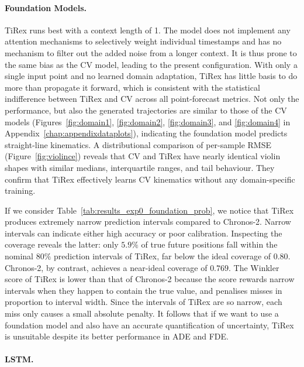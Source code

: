 \paragraph{Foundation Models.}
TiRex runs best with a context length of 1. The model does not implement any attention mechanisms to selectively weight individual timestamps and has no mechanism to filter out the added noise from a longer context. It is thus prone to the same bias as the \ac{CV} model, leading to the present configuration.
With only a single input point and no learned domain adaptation, TiRex has little basis to do more than propagate it forward, which is consistent with the statistical indifference between TiRex and \ac{CV} across all point-forecast metrics.
Not only the performance, but also the generated trajectories are similar to those of the \ac{CV} models (Figures~\ref{fig:domain1}, \ref{fig:domain2}, \ref{fig:domain3}, and \ref{fig:domain4} in Appendix~\ref{chap:appendixdataplots}), indicating the foundation model predicts straight-line kinematics.
A distributional comparison of per-sample \ac{RMSE} (Figure~\ref{fig:violince}) reveals that \ac{CV} and TiRex have nearly identical violin shapes with similar medians, interquartile ranges, and tail behaviour. They confirm that TiRex effectively learns \ac{CV} kinematics without any domain-specific training.

If we consider Table~\ref{tab:results_exp0_foundation_prob}, we notice that TiRex produces extremely narrow prediction intervals compared to Chronos-2. Narrow intervals can indicate either high accuracy or poor calibration. Inspecting the coverage reveals the latter: only $5.9\%$ of true future positions fall within the nominal $80\%$ prediction intervals of TiRex, far below the ideal coverage of $0.80$.
Chronos-2, by contrast, achieves a near-ideal coverage of $0.769$.
The Winkler score of TiRex is lower than that of Chronos-2 because the score rewards narrow intervals when they happen to contain the true value, and penalises misses in proportion to interval width.
Since the intervals of TiRex are so narrow, each miss only causes a small absolute penalty.
It follows that if we want to use a foundation model and also have an accurate quantification of uncertainty, TiRex is unsuitable despite its better performance in ADE and FDE.


\paragraph{LSTM.}

